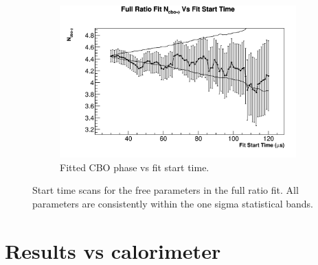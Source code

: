 \begin{figure}[]
\begin{subfigure}[t]{0.45\textwidth}
			\includegraphics[width=\textwidth]{RatioCBO_N_cbo-phi_FS_Canv}
		    \caption{Fitted CBO phase vs fit start time.}
	    \end{subfigure}%
	\caption[FitStartScans]{Start time scans for the free parameters in the full ratio fit. All parameters are consistently within the one sigma statistical bands.}
	\label{fig:FitStartScans}
	\end{figure}





\section{Results vs calorimeter}

